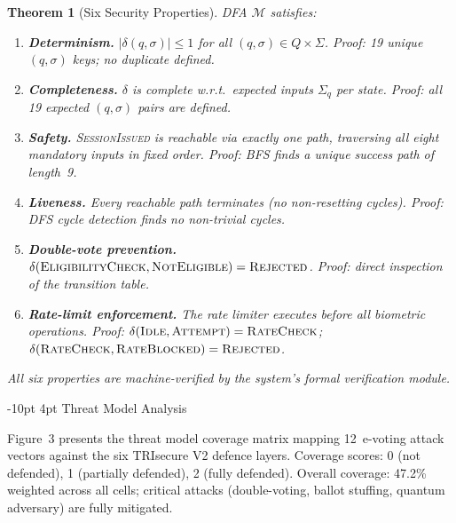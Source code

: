 \documentclass[a4paper,12pt]{article}
\makeatletter
\renewcommand\subsection{\@startsection{subsection}{2}{\z@}%
  {-10pt \@plus -3pt \@minus -2pt}{4pt \@plus 2pt}%
  {\normalfont\normalsize\itshape}}
\newtheorem{theorem}{Theorem}
\makeatother
\begin{document}
\begin{theorem}[Six Security Properties]
DFA $\mathcal{M}$ satisfies:
\renewcommand{\labelenumi}{P\arabic{enumi}.}
\begin{enumerate}
  \item \textbf{Determinism.}
    $|\delta(q,\sigma)| \leq 1$ for all $(q,\sigma) \in Q \times \Sigma$.
    \textit{Proof: 19 unique $(q,\sigma)$ keys; no duplicate defined.}
  \item \textbf{Completeness.}
    $\delta$ is complete w.r.t.\ expected inputs $\Sigma_q$ per state.
    \textit{Proof: all 19 expected $(q,\sigma)$ pairs are defined.}
  \item \textbf{Safety.}
    \textnormal{\textsc{SessionIssued}} is reachable via exactly one path,
    traversing all eight mandatory inputs in fixed order.
    \textit{Proof: BFS finds a unique success path of length~9.}
  \item \textbf{Liveness.}
    Every reachable path terminates (no non-resetting cycles).
    \textit{Proof: DFS cycle detection finds no non-trivial cycles.}
  \item \textbf{Double-vote prevention.}
    $\delta(\textnormal{\textsc{EligibilityCheck}},
    \textnormal{\textsc{NotEligible}}) = \textnormal{\textsc{Rejected}}$.
    \textit{Proof: direct inspection of the transition table.}
  \item \textbf{Rate-limit enforcement.}
    The rate limiter executes before all biometric operations.
    \textit{Proof: $\delta(\textnormal{\textsc{Idle}},
    \textnormal{\textsc{Attempt}}) = \textnormal{\textsc{RateCheck}}$;
    $\delta(\textnormal{\textsc{RateCheck}},
    \textnormal{\textsc{RateBlocked}}) = \textnormal{\textsc{Rejected}}$.}
\end{enumerate}
\renewcommand{\labelenumi}{\arabic{enumi}.}
All six properties are machine-verified by the system's formal
verification module.
\end{theorem}

\subsection{Threat Model Analysis}\label{sec:threat_matrix}

Figure~3 presents the threat model coverage matrix mapping 12~e-voting
attack vectors against the six TRIsecure V2 defence layers. Coverage
scores: 0 (not defended), 1 (partially defended), 2 (fully defended).
Overall coverage: 47.2\% weighted across all cells; critical attacks
(double-voting, ballot stuffing, quantum adversary) are fully mitigated.
\end{document}
